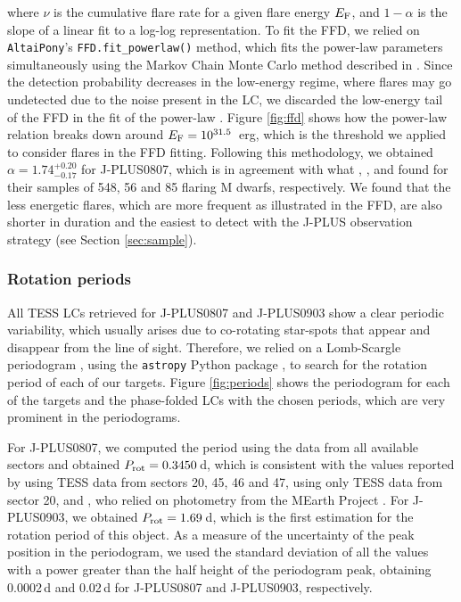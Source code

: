 where $\nu$ is the cumulative flare rate for a given flare energy $E_{\rm F}$, and $1-\alpha$ is the slope of a linear fit to a log-log representation. To fit the FFD, we relied on \texttt{AltaiPony}'s \texttt{FFD.fit\_powerlaw()} method, which fits the power-law parameters simultaneously using the Markov Chain Monte Carlo method described in \citet{wheatland2004}. Since the detection probability decreases in the low-energy regime, where flares may go undetected due to the noise present in the LC, we discarded the low-energy tail of the FFD in the fit of the power-law \citep{hawley2014,chang2015,ilin2021}. Figure \ref{fig:ffd} shows how the power-law relation breaks down around $E_{\rm F}=10^{31.5}$~erg, which is the threshold we applied to consider flares in the FFD fitting. Following this methodology, we obtained $\alpha=1.74_{-0.17}^{+0.20}$ for J-PLUS0807, which is in agreement with what \citet{lin2019}, \citet{raetz2020}, and \citet{murray2022} found for their samples of 548, 56 and 85 flaring M dwarfs, respectively. We found that the less energetic flares, which are more frequent as illustrated in the FFD, are also shorter in duration and the easiest to detect with the J-PLUS observation strategy (see Section \ref{sec:sample}).





\subsubsection{Rotation periods}
\label{sec:periods}

All TESS LCs retrieved for J-PLUS0807 and J-PLUS0903 show a clear periodic variability, which usually arises due to co-rotating star-spots that appear and disappear from the line of sight. Therefore, we relied on a Lomb-Scargle periodogram \citep{lomb,scargle}, using the \texttt{astropy} Python package \citep{astropy}, to search for the rotation period of each of our targets. Figure \ref{fig:periods} shows the periodogram for each of the  targets and the phase-folded LCs with the chosen periods, which are very prominent in the periodograms.

For J-PLUS0807, we computed the period using the data from all available sectors and obtained $P_{\rm rot}=0.3450$\,d, which is consistent with the values reported by \citet{guangwei2024} using TESS data from sectors 20, 45, 46 and 47, \citet{seli2021} using only TESS data from sector 20, and \citet{newton2016}, who relied on photometry from the MEarth Project \citep{berta2012}. For J-PLUS0903, we obtained $P_{\rm rot}=1.69$\,d, which is the first estimation for the rotation period of this object. As a measure of the uncertainty of the peak position in the periodogram, we used the standard deviation of all the values with a power greater than the half height of the periodogram peak, obtaining 0.0002\,d and 0.02\,d for J-PLUS0807 and J-PLUS0903, respectively.

